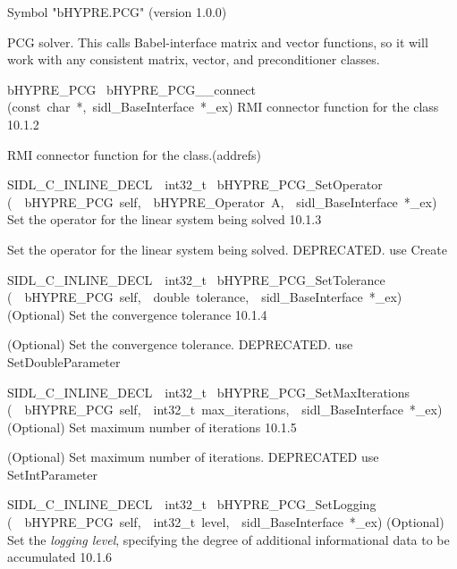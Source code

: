 \documentclass{article}
\begin{document}
\begin{cxxentry}
\begin{cxxentry}
\begin{cxxvariable}
\begin{cxxdoc}
Symbol "bHYPRE.PCG" (version 1.0.0)

PCG solver.
This calls Babel-interface matrix and vector functions, so it will work
with any consistent matrix, vector, and preconditioner classes.
\end{cxxdoc}
\end{cxxvariable}
\begin{cxxfunction}
{bHYPRE\_PCG\ }
        {bHYPRE\_PCG\_\_connect}
        {(const\ char\ *,\ sidl\_BaseInterface\ *\_ex)}
        {
RMI connector function for the class}
        {10.1.2}
\begin{cxxdoc}

RMI connector function for the class.(addrefs)
\end{cxxdoc}
\end{cxxfunction}
\begin{cxxfunction}
{SIDL\_C\_INLINE\_DECL\ \ int32\_t\ }
        {bHYPRE\_PCG\_SetOperator}
        {(\ \ bHYPRE\_PCG\ self,\ \ bHYPRE\_Operator\ A,\ \ sidl\_BaseInterface\ *\_ex)}
        {
Set the operator for the linear system being solved}
        {10.1.3}
\begin{cxxdoc}

Set the operator for the linear system being solved.
DEPRECATED.  use Create
\end{cxxdoc}
\end{cxxfunction}
\begin{cxxfunction}
{SIDL\_C\_INLINE\_DECL\ \ int32\_t\ }
        {bHYPRE\_PCG\_SetTolerance}
        {(\ \ bHYPRE\_PCG\ self,\ \ double\ tolerance,\ \ sidl\_BaseInterface\ *\_ex)}
        {
(Optional) Set the convergence tolerance}
        {10.1.4}
\begin{cxxdoc}

(Optional) Set the convergence tolerance.
DEPRECATED.  use SetDoubleParameter
\end{cxxdoc}
\end{cxxfunction}
\begin{cxxfunction}
{SIDL\_C\_INLINE\_DECL\ \ int32\_t\ }
        {bHYPRE\_PCG\_SetMaxIterations}
        {(\ \ bHYPRE\_PCG\ self,\ \ int32\_t\ max\_iterations,\ \ sidl\_BaseInterface\ *\_ex)}
        {
(Optional) Set maximum number of iterations}
        {10.1.5}
\begin{cxxdoc}

(Optional) Set maximum number of iterations.
DEPRECATED   use SetIntParameter
\end{cxxdoc}
\end{cxxfunction}
\begin{cxxfunction}
{SIDL\_C\_INLINE\_DECL\ \ int32\_t\ }
        {bHYPRE\_PCG\_SetLogging}
        {(\ \ bHYPRE\_PCG\ self,\ \ int32\_t\ level,\ \ sidl\_BaseInterface\ *\_ex)}
        {
(Optional) Set the {\it logging level}, specifying the degree
of additional informational data to be accumulated}
        {10.1.6}
\begin{cxxdoc}


\end{cxxdoc}
\end{cxxfunction}
\end{cxxentry}
\end{cxxentry}
\end{document}
